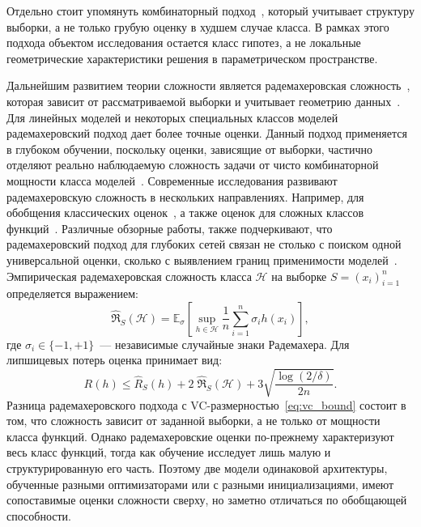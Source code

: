 Отдельно стоит упомянуть комбинаторный подход~\cite{vorontsov2004combinatorial}, который учитывает структуру выборки, а не только грубую оценку в худшем случае класса.
В рамках этого подхода объектом исследования остается класс гипотез, а не локальные геометрические характеристики решения в параметрическом пространстве.

Дальнейшим развитием теории сложности является радемахеровская сложность~\cite{koltchinskii2001rademacher,bartlett2002rademacher}, которая зависит от рассматриваемой выборки и учитывает геометрию данных~\cite{truong2022rademacher,algorithmicRademacher2023}.
Для линейных моделей и некоторых специальных классов моделей радемахеровский подход дает более точные оценки.
Данный подход применяется в глубоком обучении, поскольку оценки, зависящие от выборки, частично отделяют реально наблюдаемую сложность задачи от чисто комбинаторной мощности класса моделей~\cite{truong2022rademacher,algorithmicRademacher2023}.
Современные исследования развивают радемахеровскую сложность в нескольких направлениях. Например, для обобщения классических оценок~\cite{bartlett1996vcreal}, а также оценок для сложных классов функций~\cite{vapnik1999vccontrol}.
Различные обзорные работы, также подчеркивают, что радемахеровский подход для глубоких сетей связан не столько с поиском одной универсальной оценки, сколько с выявлением границ применимости моделей~\cite{golowich2016lessons,valleperez2020bounds}.
Эмпирическая радемахеровская сложность класса $\mathcal H$ на выборке $S=(x_i)_{i=1}^n$ определяется выражением:
\begin{equation}
\hat{\mathfrak R}_S(\mathcal H)=
\mathbb E_{\sigma}\!\left[\sup_{h\in\mathcal H}\frac{1}{n}\sum_{i=1}^n \sigma_i h(x_i)\right],
\label{eq:rademacher_def}
\end{equation}
где $\sigma_i\in\{-1,+1\}$~--- независимые случайные знаки Радемахера. Для липшицевых потерь оценка принимает вид:
\begin{equation}
R(h)\le \hat R_S(h)+2\;\hat{\mathfrak R}_S(\mathcal H)+3\sqrt{\frac{\log(2/\delta)}{2n}}.
\label{eq:rademacher_bound}
\end{equation}
Разница радемахеровского подхода с VC-размерностью~\eqref{eq:vc_bound} состоит в том, что сложность зависит от заданной выборки, а не только от мощности класса функций.
Однако радемахеровские оценки по-прежнему характеризуют весь класс функций, тогда как обучение исследует лишь малую и структурированную его часть.
Поэтому две модели одинаковой архитектуры, обученные разными оптимизаторами или с разными инициализациями, имеют сопоставимые оценки сложности сверху, но заметно отличаться по обобщающей способности.

